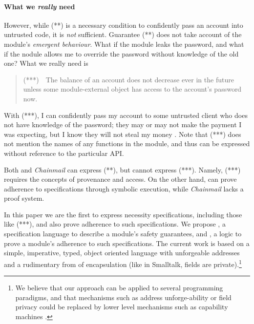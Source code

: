  
\paragraph{What we \emph{really} need} However, while (**) is a necessary condition  to confidently pass 
 an account into untrusted code, it is \emph{not} sufficient.
Guarantee (**) does not take  account of the module's \emph{emergent behaviour}.
 What if the module leaks the password, and what if the nodule allows me to override the
 password without knowledge of the old one? 
 What we really need is
 \begin{quote}
(***)\  \ The balance of an account does not decrease ever in the future unless some module-external 
object has access to the account's password now.
\end{quote}
With (***), I can confidently pass my account to some untrusted client who
  does not have
 knowledge of the password; they may or may not make the payment I was expecting, but I
 know they will not steal my money \cite{ooToSecurity,miller-esop2013}.
 Note that (***)  does not mention
 the names of any functions in the module, and 
 thus can be expressed without reference to the particular API. 
 

  Both {} and  \emph{Chainmail} can express (**), but {}  cannot express (***). 
  Namely, (***)  requires the concepts of provenance and access.
 On the other hand, {} can prove adherence to  specifications through symbolic 
  execution, while  \emph{Chainmail}   lacks a proof system. 
  
\vspace{.06in}

In this paper we are  the first to express necessity specifications, including those like (***), and 
also prove adherence to such specifications.
We propose \Chainmail, a specification language %
 to describe a module's safety guarantees,
and 
\Chainlogic,   %
a logic to prove a module's adherence to such specifications.
The current work is based on a simple, imperative, typed, object oriented
language with unforgeable addresses and a rudimentary
from of encapsulation (like in Smalltalk, fields are private).\footnote{We believe
 that our approach can be applied to several programming paradigms, and 
 that mechanisms such as address unforge-ability or field privacy
 could be replaced 
 by lower level mechanisms such as capability machines \cite{vanproving,davis2019cheriabi}.
  }


